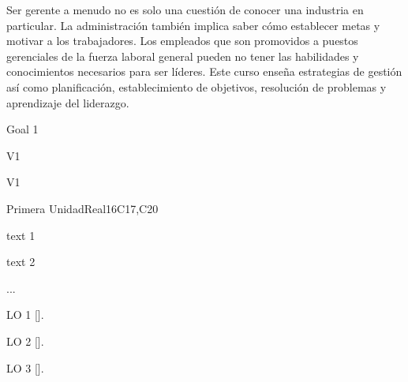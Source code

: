 \begin{syllabus}


\begin{justification}
Ser gerente a menudo no es solo una cuestión de conocer una industria en particular. La administración también implica saber cómo establecer metas y motivar a los trabajadores. Los empleados que son promovidos a puestos gerenciales de la fuerza laboral general pueden no tener las habilidades y conocimientos necesarios para ser líderes. Este curso enseña estrategias de gestión así como planificación, establecimiento de objetivos, resolución de problemas y aprendizaje del liderazgo.
\end{justification}

\begin{goals}
\item Goal 1
\end{goals}

\begin{outcomes}{V1}
   \item {}
   \item {}
   \item {}
\end{outcomes}

\begin{competences}{V1}
    \item {}
    \item {}
    \item {}
\end{competences}

\begin{unit}{}{Primera Unidad}{Real}{16}{C17,C20}
\begin{topics}
      \item text 1
      \item text 2
      \item ...
\end{topics}

\begin{learningoutcomes}
   \item LO 1 [\Usage].
   \item LO 2 [\Usage].
   \item LO 3 [\Usage].
\end{learningoutcomes}
\end{unit}

\begin{coursebibliography}
\end{coursebibliography}

\end{syllabus}
